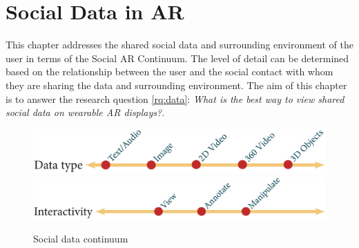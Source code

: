 \chapter{Social Data in AR} 
\label{ch:data} 



This chapter addresses the shared social data and surrounding environment of the user in terms of the Social AR Continuum. The level of detail can be determined based on the relationship between the user and the social contact with whom they are sharing the data and surrounding environment. The aim of this chapter is to answer the research question \ref{rq:data}: \textit{What is the best way to view shared social data on wearable AR displays?}. 


\begin{figure}[h]
  \centering
  \includegraphics[width=\columnwidth]{images/continuum/continuum4.2-03.eps}
  \includegraphics[width=\columnwidth]{images/continuum/continuum4.2-04.eps}
  \caption{Social data continuum}
  \label{fig:surrounding:data-continuum}
\end{figure}


